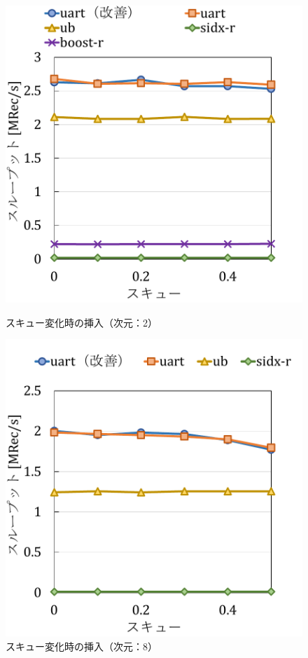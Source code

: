 \begin{figure}[tb]
  \begin{minipage}[c]{0.495\textwidth}
    \centering
    \includegraphics[scale=0.5]{./figures/graph-skew-insert-2.pdf}
    \caption{スキュー変化時の挿入（次元：2）}
    \label{graph:grouped}
  \end{minipage}
  \begin{minipage}[c]{0.495\textwidth}
    \centering
    \includegraphics[scale=0.5]{./figures/graph-skew-insert-8.pdf}
    \caption{スキュー変化時の挿入（次元：8）}
    \label{graph:paired}
  \end{minipage}
\end{figure}


